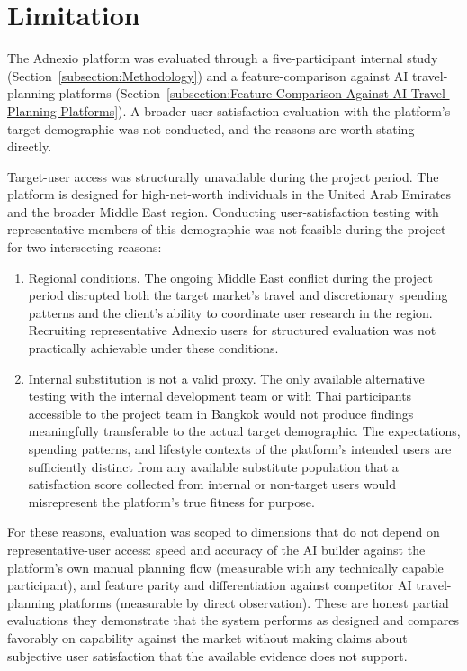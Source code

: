 \section{Limitation}
\label{section:Limitation}
The Adnexio platform was evaluated through a five-participant internal study (Section~\ref{subsection:Methodology}) and a feature-comparison against AI travel-planning platforms (Section~\ref{subsection:Feature Comparison Against AI Travel-Planning Platforms}). A broader user-satisfaction evaluation with the platform's target demographic was not conducted, and the reasons are worth stating directly.

Target-user access was structurally unavailable during the project period. The platform is designed for high-net-worth individuals in the United Arab Emirates and the broader Middle East region. Conducting user-satisfaction testing with representative members of this demographic was not feasible during the project for two intersecting reasons:

\begin{enumerate}
    \item Regional conditions. The ongoing Middle East conflict during the project period disrupted both the target market's travel and discretionary spending patterns and the client's ability to coordinate user research in the region. Recruiting representative Adnexio users for structured evaluation was not practically achievable under these conditions.
    \item Internal substitution is not a valid proxy. The only available alternative testing with the internal development team or with Thai participants accessible to the project team in Bangkok would not produce findings meaningfully transferable to the actual target demographic. The expectations, spending patterns, and lifestyle contexts of the platform's intended users are sufficiently distinct from any available substitute population that a satisfaction score collected from internal or non-target users would misrepresent the platform's true fitness for purpose.
\end{enumerate}

For these reasons, evaluation was scoped to dimensions that do not depend on representative-user access: speed and accuracy of the AI builder against the platform's own manual planning flow (measurable with any technically capable participant), and feature parity and differentiation against competitor AI travel-planning platforms (measurable by direct observation). These are honest partial evaluations they demonstrate that the system performs as designed and compares favorably on capability against the market without making claims about subjective user satisfaction that the available evidence does not support.

